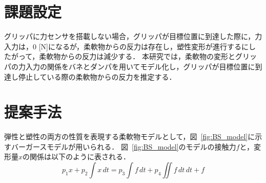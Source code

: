 \documentclass[a4paper]{jarticle}
\begin{document}
\section{課題設定}
グリッパに力センサを搭載しない場合，グリッパが目標位置に到達した際に，力入力は，0 [N]になるが，柔軟物からの反力は存在し，塑性変形が進行するにしたがって，柔軟物からの反力は減少する．
本研究では，柔軟物の変形とグリッパの力入力の関係をバネとダンパを用いてモデル化し，グリッパが目標位置に到達し停止している際の柔軟物からの反力を推定する．

\section{提案手法}
弾性と塑性の両方の性質を表現する柔軟物モデルとして，図~\ref{fig:BS_model}に示すバーガースモデルが用いられる\cite{ref_MSD}．
図~\ref{fig:BS_model}のモデルの接触力$f$と，変形量$x$の関係は以下のように表される．
\begin{equation}
p_1 {x} + p_2 \int{x}\,dt = p_3\int{f}\,dt +p_4\iint{f}\,dt\,dt  + f
\label{eq:BSmodel}
\end{equation}
\end{document}
